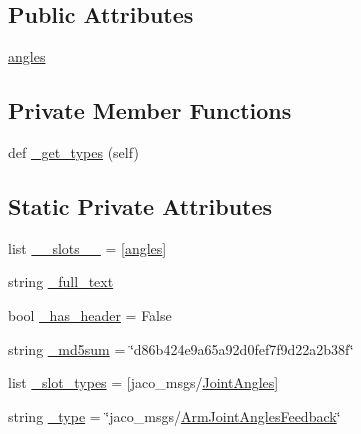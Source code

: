 \subsection*{Public Attributes}
\begin{DoxyCompactItemize}
\item 
\hyperlink{classjaco__msgs_1_1msg_1_1__ArmJointAnglesFeedback_1_1ArmJointAnglesFeedback_a831195e05399bc94228e21684caadea0}{angles}
\end{DoxyCompactItemize}
\subsection*{Private Member Functions}
\begin{DoxyCompactItemize}
\item 
def \hyperlink{classjaco__msgs_1_1msg_1_1__ArmJointAnglesFeedback_1_1ArmJointAnglesFeedback_a2cc758054b3f97671b56b6516a9d6b81}{\+\_\+get\+\_\+types} (self)
\end{DoxyCompactItemize}
\subsection*{Static Private Attributes}
\begin{DoxyCompactItemize}
\item 
list \hyperlink{classjaco__msgs_1_1msg_1_1__ArmJointAnglesFeedback_1_1ArmJointAnglesFeedback_a1b723774893dca65684d44445f9f8d12}{\+\_\+\+\_\+slots\+\_\+\+\_\+} = \mbox{[}\textquotesingle{}\hyperlink{classjaco__msgs_1_1msg_1_1__ArmJointAnglesFeedback_1_1ArmJointAnglesFeedback_a831195e05399bc94228e21684caadea0}{angles}\textquotesingle{}\mbox{]}
\item 
string \hyperlink{classjaco__msgs_1_1msg_1_1__ArmJointAnglesFeedback_1_1ArmJointAnglesFeedback_a7e129402f2fc39b86b543a3eb2542597}{\+\_\+full\+\_\+text}
\item 
bool \hyperlink{classjaco__msgs_1_1msg_1_1__ArmJointAnglesFeedback_1_1ArmJointAnglesFeedback_acaa4fe73269bd0a73f18bc0cbcb72193}{\+\_\+has\+\_\+header} = False
\item 
string \hyperlink{classjaco__msgs_1_1msg_1_1__ArmJointAnglesFeedback_1_1ArmJointAnglesFeedback_a1892c703e3a7516f097328314cc38dd3}{\+\_\+md5sum} = \char`\"{}d86b424e9a65a92d0fef7f9d22a2b38f\char`\"{}
\item 
list \hyperlink{classjaco__msgs_1_1msg_1_1__ArmJointAnglesFeedback_1_1ArmJointAnglesFeedback_a10cd489132bd069a5e9cf19faed75987}{\+\_\+slot\+\_\+types} = \mbox{[}\textquotesingle{}jaco\+\_\+msgs/\hyperlink{classjaco__msgs_1_1msg_1_1__JointAngles_1_1JointAngles}{Joint\+Angles}\textquotesingle{}\mbox{]}
\item 
string \hyperlink{classjaco__msgs_1_1msg_1_1__ArmJointAnglesFeedback_1_1ArmJointAnglesFeedback_a4ce5088bb7de77c9f7d75b98338c8d67}{\+\_\+type} = \char`\"{}jaco\+\_\+msgs/\hyperlink{classjaco__msgs_1_1msg_1_1__ArmJointAnglesFeedback_1_1ArmJointAnglesFeedback}{Arm\+Joint\+Angles\+Feedback}\char`\"{}
\end{DoxyCompactItemize}


